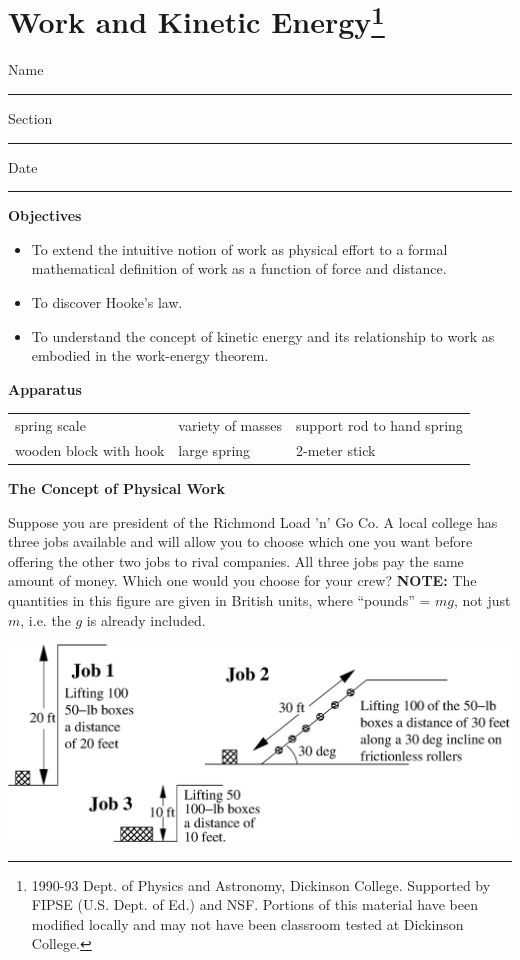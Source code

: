 \section{Work and Kinetic Energy\footnote{1990-93 Dept. of Physics and Astronomy, Dickinson College. Supported by FIPSE
(U.S. Dept. of Ed.) and NSF. Portions of this material have been modified locally
and may not have been classroom tested at Dickinson College.}}

Name \rule{2.0in}{0.1pt}\hfill{}Section \rule{1.0in}{0.1pt}\hfill{}Date \rule{1.0in}{0.1pt}

\textbf{Objectives }

\begin{itemize}
\item To extend the intuitive notion of work as physical effort to a formal mathematical
definition of work as a function of force and distance. 
\item To discover Hooke's law. 
\item To understand the concept of kinetic energy and its relationship to work as
embodied in the work-energy theorem.
\end{itemize}

\textbf{Apparatus }

\begin{center}
\begin{tabular}{lll}
spring scale            & variety of masses & support rod to hand spring\\
wooden block with hook  & large spring      & 2-meter stick \\
\end{tabular}
\end{center}

\textbf{The Concept of Physical Work }

Suppose you are president of the Richmond Load 'n' Go Co. A local college has
three jobs available and will allow you to choose which one you want before
offering the other two jobs to rival companies. All three jobs pay the same
amount of money. Which one would you choose for your crew? 
\textbf{NOTE:} The quantities in this figure are given in British units, 
where ``pounds'' = $mg$, not just $m$, i.e. the $g$ is already included.

\vspace{0.3cm}
{\par\centering \includegraphics[width=5.5in]{workAndKE/work_power_fig1b.eps} \par}
\vspace{0.3cm}

